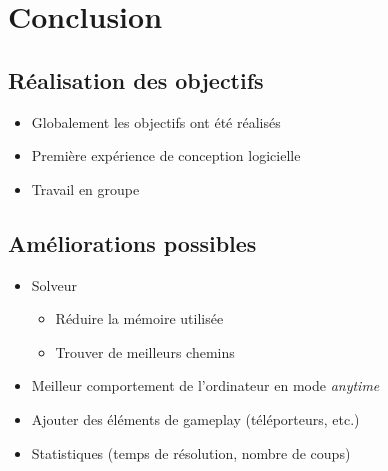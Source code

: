 \documentclass{beamer}
\begin{document}
\section{Conclusion}
\subsection{Réalisation des objectifs}
\begin{frame}
\begin{itemize}
\item Globalement les objectifs ont été réalisés
\item Première expérience de conception logicielle
\item Travail en groupe
\end{itemize}
\end{frame}

\subsection{Améliorations possibles}
\begin{frame}
\begin{itemize}
\item Solveur
\begin{itemize}
\item Réduire la mémoire utilisée
\item Trouver de meilleurs chemins
\end{itemize}
\item Meilleur comportement de l'ordinateur en mode \textit{anytime}
\item Ajouter des éléments de gameplay (téléporteurs, etc.)
\item Statistiques (temps de résolution, nombre de coups)
\end{itemize}
\end{frame}
\end{document}
